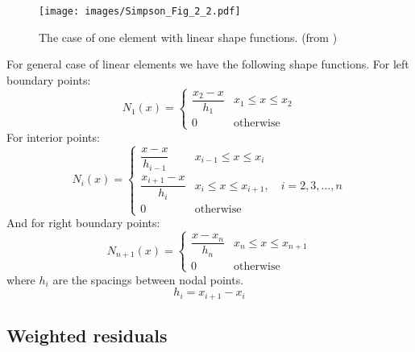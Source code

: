 \documentclass[a4paper,12pt]{article} %
\begin{document}
\begin{figure}[H]
{\centering
\texttt{[image: images/Simpson\_Fig\_2\_2.pdf]}
\par}
\caption{The case of one element with linear shape functions. (from \cite{Simpson2017})}
\label{fig:Simpson_2_2}
\end{figure}

For general case of linear elements we have the following shape functions. For left
boundary points:
\begin{equation}
N_{1}(x) = \begin{cases}
\dfrac{x_{2} - x}{h_1} & x_{1} \leq x \leq x_{2} \\[10pt]
0                     & \text{otherwise}
\end{cases}
\end{equation}
%
For interior points:
%
\begin{equation}
N_{i}(x) = \begin{cases}
\dfrac{x - x}{h_{i-1}} & x_{i-1} \leq x \leq x_{i} \\[10pt]
\dfrac{x_{i+1} - x}{h_{i}} & x_{i} \leq x \leq x_{i+1},\quad i=2,3,\ldots,n \\[10pt]
0                     & \text{otherwise}
\end{cases}
\end{equation}
%
And for right boundary points:
%
\begin{equation}
N_{n+1}(x) = \begin{cases}
\dfrac{x - x_{n}}{h_{n}} & x_{n} \leq x \leq x_{n+1} \\[10pt]
0                     & \text{otherwise}
\end{cases}
\end{equation}
%
where $h_{i}$ are the spacings between nodal points.
%
\begin{equation}
h_{i} = x_{i+1} - x_{i}
\end{equation}

\subsection{Weighted residuals}
\end{document}
